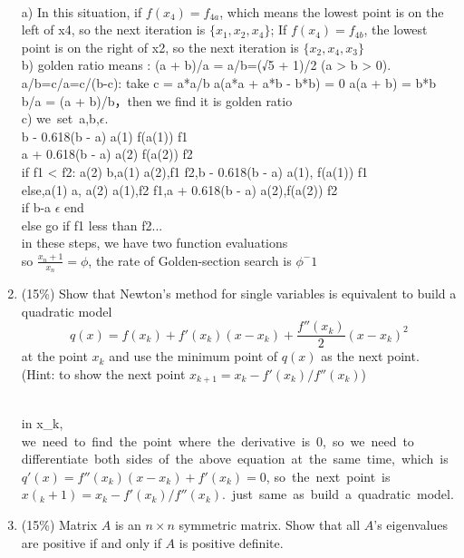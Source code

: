 \documentclass[a4paper,10pt]{article}
\begin{document}
\begin{enumerate}
{\color{blue} \\
a) In this situation, if $f(x_4)=f_{4a}$, which means the lowest point is on the left of x4, so the next iteration is $\{x_1,x_2,x_4\}$; If $f(x_4)=f_{4b}$, the lowest point is on the right of x2, so the next iteration is $\{x_2, x_4, x_3\}$
\\b) golden ratio means : (a + b)/a = a/b=(√5 + 1)/2 (a > b > 0). a/b=c/a=c/(b-c): take c = a*a/b \Rightarrow a(a*a + a*b - b*b) = 0 \Rightarrow a(a + b) = b*b \Rightarrow b/a = (a + b)/b，then we find it is golden ratio
\\c) we\ set\ a,b,$\epsilon$. \\
b - 0.618(b - a) \Rightarrow a(1) f(a(1)) \Rightarrow f1 \\
a + 0.618(b - a) \Rightarrow a(2) f(a(2)) \Rightarrow f2 \\
if f1 < f2: a(2) \Rightarrow b,a(1) \Rightarrow a(2),f1 \Rightarrow f2,b - 0.618(b - a) \Rightarrow a(1), f(a(1)) \Rightarrow f1\\
else,a(1) \Rightarrow a, a(2) \Rightarrow a(1),f2 \Rightarrow f1,a + 0.618(b - a) \Rightarrow a(2),f(a(2)) \Rightarrow f2\\
if b-a \leq $\epsilon$ end\\
else go if f1 less than f2...\\
in these steps, we have two function evaluations\\
so $\frac{x_n+1}{x_n} = \phi$, the rate of Golden-section search is $\phi^-1$\\
}

\item (15\%) Show that Newton's method for single variables is equivalent to build a quadratic model 
$$q(x) = f(x_k) + f'(x_k)(x-x_k) + \frac{f''(x_k)}{2}(x-x_k)^2$$
at the point $x_k$ and use the minimum point of $q(x)$ as the next point.  (Hint: to show the next point $x_{k+1} = x_k -f'(x_k)/f''(x_k)$) 

{\color{blue}
\\
in x_k, we\ need\ to\ find\ the\ point\ where\ the\ derivative\ is\ 0,\ so\ we\ need\ to\\ differentiate\ both\ sides\ of\ the\ above\ equation\ at\ the\ same\ time,\ which\ is\ $q'(x) = f''(x_k)(x - x_k) + f'(x_k) = 0$, so\ the\ next\ point\ is\ $x(_k+1) = x_k - f'(x_k)/f''(x_k)$.\ just\ same\ as\ build\ a\ quadratic\ model.
\\

}

\item (15\%) Matrix $A$ is an $n\times n$ symmetric matrix.  Show that  
all $A$'s eigenvalues are positive if and only if $A$ is positive definite. 


\end{enumerate}
\end{document}
